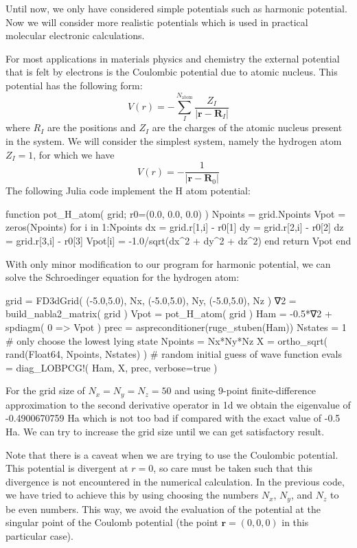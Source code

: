 Until now, we only have considered simple potentials such as harmonic potential. Now we will
consider more realistic potentials which is used in practical molecular electronic calculations.

For most applications in materials physics and chemistry the external potential that is
felt by electrons is the Coulombic potential due to atomic nucleus. This potential has
the following form:
\begin{equation}
V(r) = -\sum_{I}^{N_{\mathrm{atom}}} \frac{Z_{I}}{\left|\mathbf{r} - \mathbf{R}_{I}\right|}
\end{equation}
where $R_{I}$ are the positions and $Z_{I}$ are the charges
of the atomic nucleus present in the system.
%
We will consider the simplest system, namely the hydrogen atom $Z_{I}=1$, for which we have
\begin{equation}
V(r) = -\frac{1}{\left|\mathbf{r} - \mathbf{R}_{0}\right|}
\end{equation}
%
The following Julia code implement the H atom potential:
\begin{juliacode}
function pot_H_atom( grid; r0=(0.0, 0.0, 0.0) )
  Npoints = grid.Npoints
  Vpot = zeros(Npoints)
  for i in 1:Npoints
    dx = grid.r[1,i] - r0[1]
    dy = grid.r[2,i] - r0[2]
    dz = grid.r[3,i] - r0[3]
    Vpot[i] = -1.0/sqrt(dx^2 + dy^2 + dz^2)
  end
  return Vpot
end
\end{juliacode}

With only minor modification to our program for harmonic potential, we can solve the Schroedinger
equation for the hydrogen atom:
\begin{juliacode}
grid = FD3dGrid( (-5.0,5.0), Nx, (-5.0,5.0), Ny, (-5.0,5.0), Nz )
∇2 = build_nabla2_matrix( grid )
Vpot = pot_H_atom( grid )
Ham = -0.5*∇2 + spdiagm( 0 => Vpot )
prec = aspreconditioner(ruge_stuben(Ham))
Nstates = 1  # only choose the lowest lying state
Npoints = Nx*Ny*Nz
X = ortho_sqrt( rand(Float64, Npoints, Nstates) ) # random initial guess of wave function
evals = diag_LOBPCG!( Ham, X, prec, verbose=true )
\end{juliacode}

For the grid size of $N_{x}=N_{y}=N_{z}=50$ and using 9-point finite-difference approximation
to the second derivative operator in 1d we obtain the eigenvalue of -0.4900670759 Ha which
is not too bad if compared with the exact value of -0.5 Ha. We can try to increase the grid
size until we can get satisfactory result.

Note that there is a caveat when we are trying to use the Coulombic potential. This potential
is divergent at $r=0$, so care must be taken such that this divergence is not encountered in
the numerical calculation. In the previous code, we have tried to achieve this by using
choosing the numbers
$N_{x}$, $N_{y}$, and $N_{z}$ to be even numbers. This way, we avoid the evaluation of
the potential at the singular point of the Coulomb potential
(the point $\mathbf{r} = (0,0,0)$ in this
particular case).

